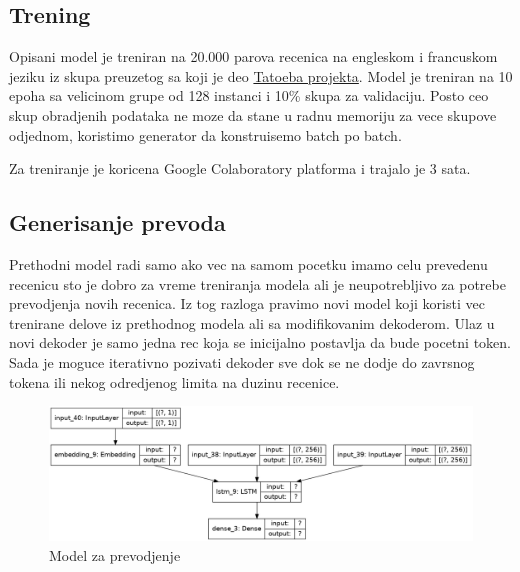 \documentclass[a4paper]{article}
\begin{document}
\subsection{Trening}

Opisani model je treniran na 20.000 parova recenica na engleskom i francuskom jeziku iz skupa preuzetog sa \cite{manythings} koji je deo \href{https://tatoeba.org/eng}{Tatoeba projekta}. Model je treniran na 10 epoha sa velicinom grupe od 128 instanci i 10\% skupa za validaciju. Posto ceo skup obradjenih podataka ne moze da stane u radnu memoriju za vece skupove odjednom, koristimo generator da konstruisemo batch po batch.

Za treniranje je koricena Google Colaboratory platforma i trajalo je 3 sata.

\subsection{Generisanje prevoda}

Prethodni model radi samo ako vec na samom pocetku imamo celu prevedenu recenicu sto je dobro za vreme treniranja modela ali je neupotrebljivo za potrebe prevodjenja novih recenica. Iz tog razloga pravimo novi model koji koristi vec trenirane delove iz prethodnog modela ali sa modifikovanim dekoderom. Ulaz u novi dekoder je samo jedna rec koja se inicijalno postavlja da bude pocetni token. Sada je moguce iterativno pozivati dekoder sve dok se ne dodje do zavrsnog tokena ili nekog odredjenog limita na duzinu recenice.

\begin{figure}[h!]
  \centering
    \includegraphics[width=\textwidth]{inference_model}
  \caption{Model za prevodjenje}
  \label{fig:inference_model}
\end{figure}
\end{document}
